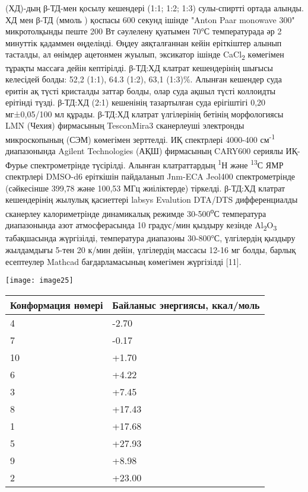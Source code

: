 \begin{multicols}{2}
(ХД)-дың β-ТД-мен қосылу кешендері (1:1; 1:2; 1:3) сулы-спиртті ортада
алынды. ХД мен β-ТД (ммоль ) қоспасы 600 секунд ішінде "Anton Paar
monowave 300" микротолқынды пеште 200 Вт сәулелену қуатымен 70°С
температурада әр 2 минуттік қадаммен өңделінді. Өңдеу аяқталғаннан кейін
еріткіштер алынып тасталды, ал өнімдер ацетонмен жуылып, эксикатор
ішінде CaCl\textsubscript{2} көмегімен тұрақты массаға дейін кептірілді.
β-ТД:ХД клатрат кешендерінің шығысы келесідей болды: 52,2 (1:1), 64.3
(1:2), 63,1 (1:3)\%. Алынған кешендер суда еритін ақ түсті кристалды
заттар болды, олар суда ақшыл түсті коллоидты ерітінді түзді. β-ТД:ХД
(2:1) кешенінің тазартылған суда ерігіштігі 0,20 мг±0,05/100 мл құрады.
β-ТД:ХД клатрат үлгілерінің бетінің морфологиясы LMN (Чехия) фирмасының
TesconMira3 сканерлеуші электронды микроскопының (СЭМ) көмегімен
зерттелді. ИҚ спектрлері 4000-400 см\textsuperscript{-1} диапазонында
Agilent Technologies (АҚШ) фирмасының CARY600 сериялы ИҚ-Фурье
спектрометрінде түсірілді. Алынған клатраттардың \textsuperscript{1}Н
және \textsuperscript{13}С ЯМР спектрлері DMSO-d6 еріткішін пайдаланып
Jnm-ECA Jeol400 спектрометрінде (сәйкесінше 399,78 және 100,53 МГц
жиіліктерде) тіркелді. β-ТД:ХД клатрат кешендерінің жылулық қасиеттері
labsys Evalution DTA/DTS дифференциалды сканерлеу калориметрінде
динамикалық режимде 30-500\textsuperscript{о}С температура диапазонында
азот атмосферасында 10 градус/мин қыздыру кезінде
Al\textsubscript{2}O\textsubscript{3} табақшасында жүргізілді,
температура диапазоны 30-800°С, үлгілердің қыздыру жылдамдығы 5-тен 20
к/мин дейін, үлгілердің массасы 12-16 мг болды, барлық есептеулер
Mathcad бағдарламасының көмегімен жүргізілді {[}11{]}.

{\centering
\texttt{[image: image25]}
}
{\centering
\begin{tabular}{|p{}|p{}|}
\hline
\textbf{Конформация нөмері} & \textbf{Байланыс энергиясы, ккал/моль} \\
\hline
4 & -2.70 \\
7 & -0.17 \\
10 & +1.70 \\
6 & +4.22 \\
3 & +7.45 \\
8 & +17.43 \\
1 & +17.68 \\
5 & +27.93 \\
9 & +8.98 \\
2 & +23.00 \\
\hline
\end{tabular}
}


\end{multicols}

